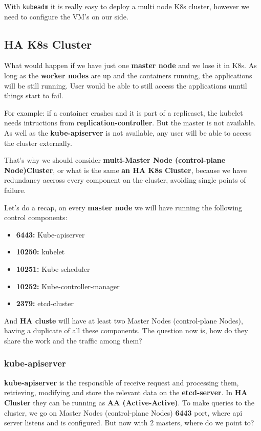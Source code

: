 \documentclass{article}
\begin{document}
With \verb|kubeadm| it is really easy to deploy a multi node K8s cluster, however we need to configure the VM's on our side.

\subsection{HA K8s Cluster}
What would happen if we have just one \textbf{master node} and we lose it in K8s. As long as the \textbf{worker nodes} are up and
the containers running, the applications will be still running. User would be able to still access the applications unntil things start to fail. 

For example: if a container crashes and it is part of a replicaset, the kubelet needs intructions from 
\textbf{replication-controller}. But the master is not available. As well as the \textbf{kube-apiserver} is not available, any user will be able to access the cluster externally.

That's why we should consider \textbf{multi-Master Node (control-plane Node)Cluster}, or what is the same \textbf{an HA K8s Cluster}, because we have redundancy accross every component on the cluster, avoiding single points of failure.

Let's do a recap, on every \textbf{master node} we will have running the following control components:
\begin{itemize}
    \item \textbf{6443:} Kube-apiserver
    \item \textbf{10250:} kubelet
    \item \textbf{10251:} Kube-scheduler
    \item \textbf{10252:} Kube-controller-manager
    \item \textbf{2379:} etcd-cluster
\end{itemize}

And \textbf{HA cluste} will have at least two Master Nodes (control-plane Nodes), having a duplicate of all these components. The question now is, how do they share the work and the traffic among them?

\subsubsection{kube-apiserver}
\textbf{kube-apiserver} is the responsible of receive request and processing them, retrieving, modifying and store the relevant data on the \textbf{etcd-server}. In \textbf{HA Cluster} they can be running as \textbf{AA (Active-Active)}. To make queries to the cluster, we go on Master Nodes (control-plane Nodes) \textbf{6443} port, where api server listens and is configured.
But now with 2 masters, where do we point to?
\end{document}
